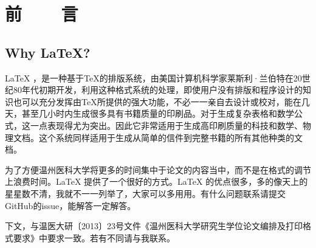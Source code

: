 \chapter{前~~~~言}
\section{Why \LaTeX ? }
\LaTeX{} ，是一种基于\TeX{}的排版系统，由美国计算机科学家莱斯利·兰伯特在20世纪80年代初期开发，利用这种格式系统的处理，即使用户没有排版和程序设计的知识也可以充分发挥由\TeX{}所提供的强大功能，不必一一亲自去设计或校对，能在几天，甚至几小时内生成很多具有书籍质量的印刷品。对于生成复杂表格和数学公式，这一点表现得尤为突出。因此它非常适用于生成高印刷质量的科技和数学、物理文档。这个系统同样适用于生成从简单的信件到完整书籍的所有其他种类的文档。

为了方便温州医科大学将更多的时间集中于论文的内容当中，而不是在格式的调节上浪费时间。\LaTeX{} 提供了一个很好的方式。\LaTeX{} 的优点很多，多的像天上的星星数不清，我就不一一列举了，大家可以多用用。有什么问题联系请提交GitHub的issue，能解答一定解答。
\par 下文，与温医大研〔2013〕23号文件《温州医科大学研究生学位论文编排及打印格式要求》中要求一致。若有不同请与我联系。

